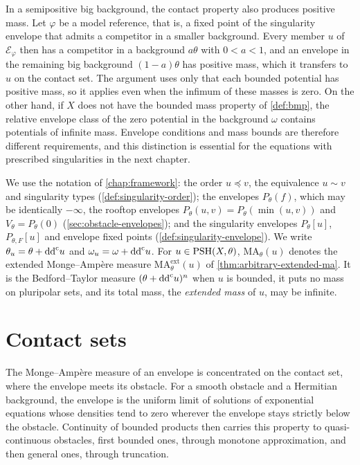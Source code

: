 In a semipositive big background, the contact property also produces positive mass. Let $\varphi$ be a model reference, that is, a fixed point of the singularity envelope that admits a competitor in a smaller background. Every member $u$ of $\mathcal E_\varphi$ then has a competitor in a background $a\theta$ with $0<a<1$, and an envelope in the remaining big background $(1-a)\theta$ has positive mass, which it transfers to $u$ on the contact set. The argument uses only that each bounded potential has positive mass, so it applies even when the infimum of these masses is zero. On the other hand, if $X$ does not have the bounded mass property of \cref{def:bmp}, the relative envelope class of the zero potential in the background $\omega$ contains potentials of infinite mass. Envelope conditions and mass bounds are therefore different requirements, and this distinction is essential for the equations with prescribed singularities in the next chapter.

We use the notation of \cref{chap:framework}: the order $u\preceq v$, the equivalence $u\sim v$ and singularity types (\cref{def:singularity-order}); the envelopes $P_\theta(f)$, which may be identically $-\infty$, the rooftop envelopes $P_\theta(u,v)=P_\theta(\min(u,v))$ and $V_\theta=P_\theta(0)$ (\cref{sec:obstacle-envelopes}); and the singularity envelopes $P_\theta[u]$, $P_{\theta,F}[u]$ and envelope fixed points (\cref{def:singularity-envelope}). We write $\theta_u=\theta+\mathrm{dd}^{\mathrm{c}} u$ and $\omega_u=\omega+\mathrm{dd}^{\mathrm{c}} u$. For $u\in\mathrm{PSH}(X,\theta)$, $\mathrm{MA}_\theta(u)$ denotes the extended Monge--Amp\`ere measure $\mathrm{MA}^{\mathrm{ext}}_\theta(u)$ of \cref{thm:arbitrary-extended-ma}. It is the Bedford--Taylor measure $(\theta+\mathrm{dd}^{\mathrm{c}} u)^n$ when $u$ is bounded, it puts no mass on pluripolar sets, and its total mass, the \emph{extended mass} of $u$, may be infinite.

\section{Contact sets}

The Monge--Amp\`ere measure of an envelope is concentrated on the contact set, where the envelope meets its obstacle. For a smooth obstacle and a Hermitian background, the envelope is the uniform limit of solutions of exponential equations whose densities tend to zero wherever the envelope stays strictly below the obstacle. Continuity of bounded products then carries this property to quasi-continuous obstacles, first bounded ones, through monotone approximation, and then general ones, through truncation.

